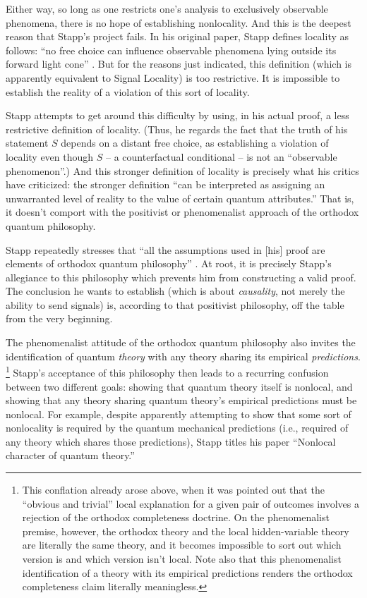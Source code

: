 \documentclass[aps,prc,onecolumn,12pt,nofootinbib]{revtex4-2}
\begin{document}
Either way, so long as one restricts one's analysis
to exclusively observable phenomena, there is no hope of
establishing nonlocality.
And this is the deepest reason that Stapp's project fails.  In his
original paper, Stapp defines locality as follows:  ``no free choice
can influence observable phenomena lying outside its forward light
cone'' \cite{stapp1}.  But for the reasons just indicated, this
definition (which is apparently equivalent to Signal Locality) is
too restrictive.  It is impossible to establish the reality of a violation of
this sort of locality.

Stapp attempts to get around this difficulty
by using, in his actual proof, a less restrictive definition of locality.
(Thus, he regards the fact that the truth of his statement $S$
depends on a distant free choice, as establishing a violation of
locality even though $S$ -- a counterfactual conditional -- is not an
``observable phenomenon''.)  And this stronger definition of locality
is precisely what his critics have criticized:  the stronger
definition ``can be interpreted as assigning an unwarranted level of
reality to the value of certain quantum attributes.''  \cite{unruh}
That is, it doesn't comport with the positivist or phenomenalist
approach of the orthodox quantum philosophy.

Stapp repeatedly stresses that ``all the
assumptions used in [his] proof are elements of orthodox quantum
philosophy'' \cite{stappresponse}.  At root, it is precisely Stapp's
allegiance to this philosophy which prevents him from constructing a
valid proof.  The conclusion he wants to establish (which is about
\emph{causality}, not merely the ability to send signals) is,
according to that positivist philosophy, off the table
from the very beginning.

The phenomenalist attitude of the orthodox quantum philosophy also
invites the identification of quantum \emph{theory} with any theory
sharing its empirical \emph{predictions}.%
\footnote{This conflation already arose above,
  when it was pointed out that the ``obvious and trivial'' local
  explanation for a given pair of outcomes involves a rejection of the
  orthodox completeness doctrine.  On the phenomenalist premise,
  however, the orthodox theory and the local hidden-variable theory
  are literally the same theory, and it becomes impossible to sort out
  which version is and which version isn't local.  Note also that this
  phenomenalist identification of a theory with its empirical
  predictions renders the orthodox completeness claim literally
  meaningless.}
Stapp's acceptance of this philosophy then leads to a recurring confusion
between two different goals:  showing that quantum theory
itself is nonlocal, and showing that any theory sharing quantum
theory's empirical predictions must be nonlocal.  For example, despite
apparently attempting to show
that some sort of nonlocality is required by the quantum mechanical
predictions (i.e., required of any theory which shares those
predictions), Stapp titles his paper ``Nonlocal character of quantum
theory.''
\end{document}
